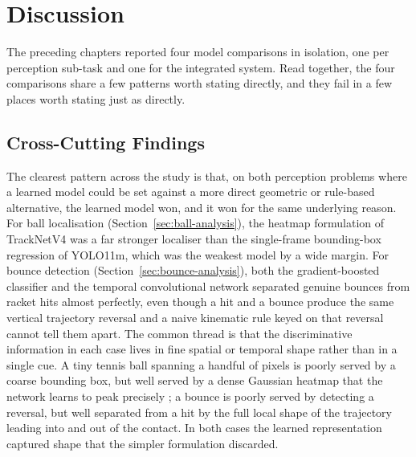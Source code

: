 \chapter{Discussion}
\label{ch:discussion}

The preceding chapters reported four model comparisons in isolation, one per perception sub-task and one for the integrated system. Read together, the four comparisons share a few patterns worth stating directly, and they fail in a few places worth stating just as directly.

\section{Cross-Cutting Findings}
\label{sec:disc-findings}

The clearest pattern across the study is that, on both perception problems where a learned model could be set against a more direct geometric or rule-based alternative, the learned model won, and it won for the same underlying reason. For ball localisation (Section~\ref{sec:ball-analysis}), the heatmap formulation of TrackNetV4 was a far stronger localiser than the single-frame bounding-box regression of YOLO11m, which was the weakest model by a wide margin. For bounce detection (Section~\ref{sec:bounce-analysis}), both the gradient-boosted classifier and the temporal convolutional network separated genuine bounces from racket hits almost perfectly, even though a hit and a bounce produce the same vertical trajectory reversal and a naive kinematic rule keyed on that reversal cannot tell them apart. The common thread is that the discriminative information in each case lives in fine spatial or temporal shape rather than in a single cue. A tiny tennis ball spanning a handful of pixels is poorly served by a coarse bounding box, but well served by a dense Gaussian heatmap that the network learns to peak precisely \cite{huang2019tracknet, cheng2023smallobjectsurvey}; a bounce is poorly served by detecting a reversal, but well separated from a hit by the full local shape of the trajectory leading into and out of the contact. In both cases the learned representation captured shape that the simpler formulation discarded.

